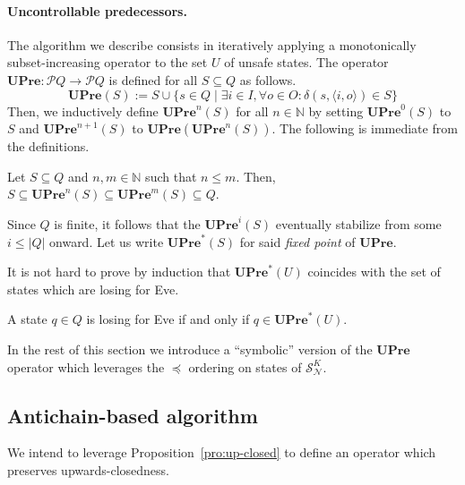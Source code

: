 \documentclass[runningheads,a4paper,draft]{llncs}
\newcommand{\pow}{\mathcal{P}}
\newcommand{\upre}{\mathbf{UPre}}
\newcommand{\eve}{Eve\xspace}
\newcommand{\calN}{\mathcal{N}}
\newcommand{\calS}{\mathcal{S}}
\begin{document}
\paragraph{Uncontrollable predecessors.} The algorithm we describe
consists in iteratively applying a monotonically subset-increasing operator to
the set $U$ of unsafe states. The operator $\upre : \pow{Q} \to \pow{Q}$ is
defined for all $S \subseteq Q$ as follows.
\[
  \upre(S) := S \cup \{s \in Q \mid \exists i \in I, \forall o \in O :
  \delta(s,\langle i, o \rangle) \in S\}
\]
Then, we inductively define $\upre^n(S)$ for all $n \in \mathbb{N}$ by setting
$\upre^0(S)$ to $S$ and $\upre^{n+1}(S)$ to $\upre(\upre^{n}(S))$.
The following is immediate from the definitions.
\begin{lemma}
  Let $S \subseteq Q$ and $n,m \in \mathbb{N}$ such that $n \leq m$. Then,
  $S \subseteq \upre^n(S) \subseteq \upre^m(S) \subseteq Q$.
\end{lemma}
Since $Q$ is finite, it follows that the $\upre^i(S)$ eventually stabilize
from some $i \leq |Q|$ onward.  Let us write $\upre^*(S)$ for said \emph{fixed point}
of $\upre$.

It is not hard to prove by induction that $\upre^*(U)$ coincides with the set
of states which are losing for \eve.
\begin{proposition}
  A state $q \in Q$ is losing for \eve if and only if $q \in \upre^*(U)$.
\end{proposition}

In the rest of this section we introduce a ``symbolic'' version of the $\upre$
operator which leverages the $\preceq$ ordering on states of $\calS^K_\calN$.

\subsection{Antichain-based algorithm}
We intend to leverage Proposition~\ref{pro:up-closed} to define an operator
which preserves upwards-closedness.



{ }
\end{document}
